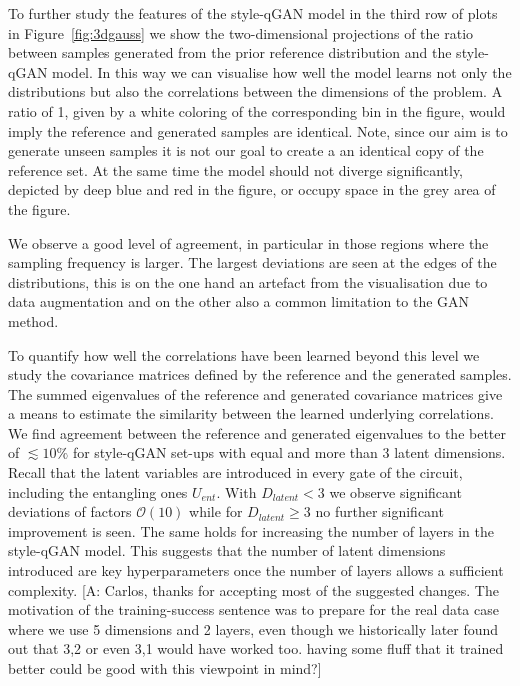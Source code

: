 \documentclass[twocolumn,preprintnumbers,superscriptaddress]{revtex4-2}
\newcommand{\commentAF}[1]{{\color{cyan} {[A: #1]}}}
\begin{document}
To further study the features of the style-qGAN model in the third row of plots in Figure~\ref{fig:3dgauss} we show the two-dimensional projections of the ratio between samples generated from the prior reference distribution and the style-qGAN model.
In this way we can visualise how well the model learns not only the distributions but also the correlations between the dimensions of the problem. A ratio of 1, given by a white coloring of the corresponding bin in the figure, would imply the reference and generated samples are identical. Note, since our aim is to generate unseen samples it is not our goal to create a an identical copy of the reference set. At the same time the model should not diverge significantly, depicted by deep blue and red in the figure, or occupy space in the grey area of the figure. 

We observe a good level of agreement, in particular in those regions where the
sampling frequency is larger. The largest deviations are seen at the edges of the distributions, this is on the one hand an artefact from the visualisation due to data augmentation and on the other also a common limitation to the GAN method.

To quantify how well the correlations have been learned beyond 
this level we study the covariance matrices defined by the reference and the generated samples. The summed eigenvalues of the reference and generated covariance matrices give a means to estimate the similarity between the learned underlying correlations. We find agreement between the reference and generated eigenvalues to the better of $\lesssim 10\%$ for style-qGAN set-ups with equal and more than 3 latent dimensions. Recall that the latent variables are introduced in every gate of the circuit, including the entangling ones $U_{ent}$.  With $D_{latent}< 3$ we observe significant deviations of factors $\mathcal{O}(10)$ while for $D_{latent}\geq 3$ no further significant improvement is seen. The same holds for increasing the number of layers in the style-qGAN model. This suggests that the number of latent dimensions introduced are key hyperparameters once the number of layers allows a sufficient complexity.
\commentAF{Carlos, thanks for accepting most of the suggested changes. The motivation of the training-success sentence was to prepare for the real data case where we use 5 dimensions and 2 layers, even though we historically later found out that 3,2 or even 3,1 would have worked too. having some fluff that it trained better could be good with this viewpoint in mind?}
\end{document}
